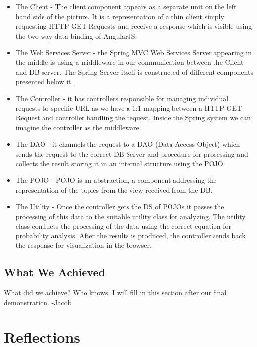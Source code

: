 \documentclass{l3proj}
\begin{document}
\begin{itemize}
\item The Client - The client component appears as a separate unit on the left hand side of the picture. It is a representation of a thin client simply requesting HTTP GET Requests and receive a response which is visible using the two-way data binding of AngularJS.

\item The Web Services Server - the Spring MVC Web Services Server appearing in the middle is using a middleware in our communication between the Client and DB server. The Spring Server itself is constructed of different components presented below it.

\item The Controller - it has controllers responsible for managing individual requests to specific URL as we have a 1:1 mapping between a HTTP GET Request and controller handling the request. Inside the Spring system we can imagine the controller as the middleware.

\item The DAO - it channels the request to a DAO (Data Access Object) which sends the request to the correct DB Server and procedure for processing and collects the result storing it in an internal structure using the POJO.

\item The POJO - POJO is an abstraction, a component addressing the representation of the tuples from the view received from the DB.

\item The Utility - Once the controller gets the DS of POJOs it passes the processing of this data to the suitable utility class for analyzing. The utility class conducts the processing of the data using the correct equation for probability analysis. After the results is produced, the controller sends back the response for visualization in the browser. 
\end{itemize}

\section{What We Achieved}
\label{achievements}

What did we achieve? Who knows. I will fill in this section after our final demonstration. -Jacob

\chapter{Reflections}
\end{document}
